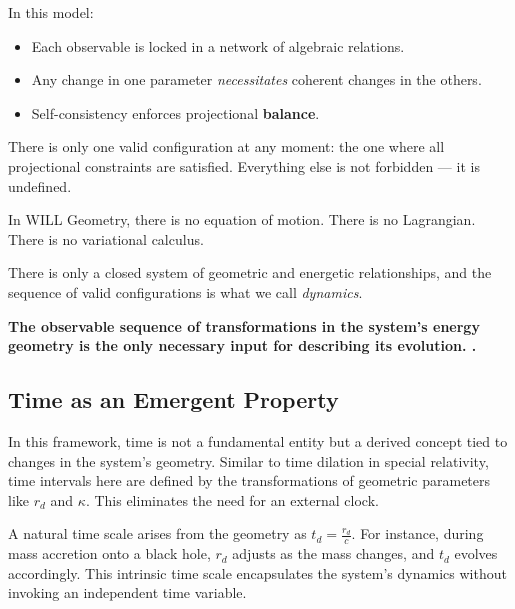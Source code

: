 \documentclass[12pt, a4paper]{article}
\begin{document}
In this model:

\begin{itemize}
    \item Each observable is locked in a network of algebraic relations.
    \item Any change in one parameter \textit{necessitates} coherent changes in the others.
    \item   Self-consistency enforces projectional  \textbf{balance}.
\end{itemize}

There is only one valid configuration at any moment:  
the one where all projectional constraints are satisfied.  
Everything else is not forbidden — it is undefined.

\begin{tcolorbox}[colback=gray!5, colframe=black!80!black, title=Geometric Principle of Action]
In WILL Geometry, there is no equation of motion.  
There is no Lagrangian.  
There is no variational calculus.  

There is only a closed system of geometric and energetic relationships,  
and the sequence of valid configurations is what we call \textit{dynamics}.
\end{tcolorbox}

\begin{tcolorbox}[colback=gray!5,colframe=black!40!black,title=The only necessary input:]
 \textbf{The observable sequence of transformations in the system's energy geometry is the only necessary input for describing its evolution.
.}\end{tcolorbox}

\subsection{Time as an Emergent Property}

In this framework, time is not a fundamental entity but a derived concept tied to changes in the system's geometry. Similar to time dilation in special relativity, time intervals here are defined by the transformations of geometric parameters like \(r_{d}\) and \(\kappa\). This eliminates the need for an external clock.

A natural time scale arises from the geometry as \(t_{d} = \frac{r_{d}}{c}\). For instance, during mass accretion onto a black hole, \(r_{d}\) adjusts as the mass changes, and \(t_{d}\) evolves accordingly. This intrinsic time scale encapsulates the system's dynamics without invoking an independent time variable.
\end{document}
